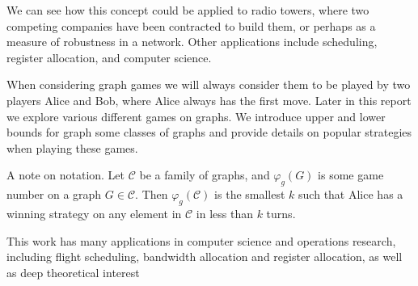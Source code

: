 We can see how this concept could be applied to radio towers, where two competing companies have been contracted to build them, or perhaps as a measure of robustness in a network. Other applications include scheduling, register allocation, and computer science.  

When considering graph games we will always consider them to be played by two players Alice and Bob, where Alice always has the first move. Later in this report we explore various different games on graphs. We introduce upper and lower bounds for graph some classes of graphs and provide details on popular strategies when playing these games.   




A note on notation. Let $\mathcal{C}$ be a family of graphs, and $\varphi_g(G)$ is some game number on a graph $G \in \mathcal{C}$. Then $\varphi_g(\mathcal{C})$ is the smallest $k$ such that Alice has a winning strategy on any element in $\mathcal{C}$ in less than $k$ turns.
   
    
This work has many applications in computer science and operations research, including flight scheduling, bandwidth allocation and register allocation, as well as deep theoretical interest%
    
    
    
    
    
    
    
    
    
    
    
    
    
    
    
    
    
    
    
    
    
    
    